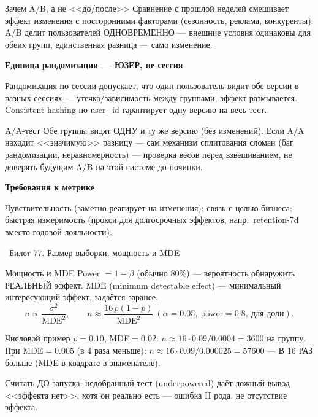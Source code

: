 \documentclass[12pt, a4paper]{article}
\newcommand{\bilet}[2]{%
  \vspace{10pt}%
  \noindent\colorbox{qcolor}{\parbox{\dimexpr\linewidth-2\fboxsep\relax}{%
    \color{white}\large\bfseries\strut\ Билет #1. #2%
  }}%
  \nopagebreak\vspace{5pt}\par\nopagebreak%
}
\newcommand{\qsub}[1]{%
  \vspace{5pt}%
  {\bfseries\color{defblue} #1}%
  \par\vspace{2pt}%
}
\begin{document}
\begin{exbox}{Зачем A/B, а не <<до/после>>}
Сравнение с прошлой неделей смешивает эффект изменения с посторонними факторами (сезонность, реклама, конкуренты). A/B делит пользователей ОДНОВРЕМЕННО --- внешние условия одинаковы для обеих групп, единственная разница --- само изменение.
\end{exbox}

\qsub{Единица рандомизации --- ЮЗЕР, не сессия}
Рандомизация по сессии допускает, что один пользователь видит обе версии в разных сессиях --- утечка/зависимость между группами, эффект размывается. Consistent hashing по user\_id гарантирует одну версию на весь тест.

\begin{propbox}{A/A-тест}
Обе группы видят ОДНУ и ту же версию (без изменений). Если A/A находит <<значимую>> разницу --- сам механизм сплитования сломан (баг рандомизации, неравномерность) --- проверка весов перед взвешиванием, не доверять будущим A/B на этой системе до починки.
\end{propbox}

\qsub{Требования к метрике}
Чувствительность (заметно реагирует на изменения); связь с целью бизнеса; быстрая измеримость (прокси для долгосрочных эффектов, напр.\ retention-7d вместо годовой лояльности).

\bilet{77}{Размер выборки, мощность и MDE}

\begin{defbox}{Мощность и MDE}
Power $=1-\beta$ (обычно 80\%) --- вероятность обнаружить РЕАЛЬНЫЙ эффект. MDE (minimum detectable effect) --- минимальный интересующий эффект, задаётся заранее.
\[
  n \propto \frac{\sigma^2}{\text{MDE}^2}, \qquad n \approx \frac{16\,p(1-p)}{\text{MDE}^2} \ (\alpha{=}0.05,\ \text{power}{=}0.8,\ \text{для доли}).
\]
\end{defbox}

\begin{exbox}{Числовой пример}
$p=0.10$, MDE$=0.02$: $n\approx16\cdot0.09/0.0004=3600$ на группу. При MDE$=0.005$ (в 4 раза меньше): $n\approx16\cdot0.09/0.000025=57600$ --- В 16 РАЗ больше (MDE в квадрате в знаменателе).
\end{exbox}

\begin{fishkabox}
Считать ДО запуска: недобранный тест (underpowered) даёт ложный вывод <<эффекта нет>>, хотя он реально есть --- ошибка II рода, не отсутствие эффекта.
\end{fishkabox}
\end{document}

